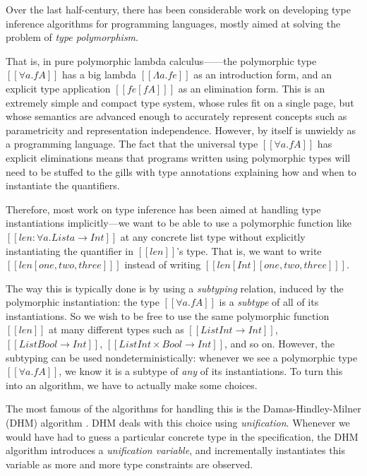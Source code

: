 Over the last half-century, there has been considerable work on developing type
inference algorithms for programming languages,  mostly aimed at solving the
problem of \emph{type polymorphism}.

That is, in pure polymorphic lambda
calculus---\systemf\cite{girard-system-f,jcr-system-f}---the polymorphic type
$[[∀a.fA]]$ has a big lambda $[[Λa.fe]]$ as an introduction form, and an
explicit type application $[[ fe[fA] ]]$ as an elimination form. This is an
extremely simple and compact type system, whose rules fit on a single page, but
whose semantics are advanced enough to accurately represent concepts such as
parametricity and representation independence. However, \systemf by itself is
unwieldy as a programming language. The fact that the universal type $[[∀a.fA]]$
has explicit eliminations means that programs written using polymorphic types
will need to be stuffed to the gills with type annotations explaining how and
when to instantiate the quantifiers.

Therefore, most work on type inference has been aimed at handling type
instantiations implicitly---we want to be able to use a polymorphic function
like $[[len : ∀a.List a → Int]]$ at any concrete list type without explicitly
instantiating the quantifier in $[[len]]$'s type. That is, we want to write
$[[ len [one,two,three] ]]$ instead of writing
$[[ len [Int] [one,two,three] ]]$.

The way this is typically done is by using a \emph{subtyping} relation, induced
by the polymorphic instantiation: the type $[[∀a.fA]]$ is a \emph{subtype} of
all of its instantiations. So we wish to be free to use the same polymorphic
function $[[len]]$ at many different types such as $[[List Int → Int]]$, $[[List
Bool → Int]]$, $[[List Int × Bool → Int]]$, and so on. However, the subtyping
can be used nondeterministically: whenever we see a polymorphic type
$[[∀a.fA]]$, we know it is a subtype of \emph{any} of its instantiations. To
turn this into an algorithm, we have to actually make some choices. 

The most famous of the algorithms for handling this is the Damas-Hindley-Milner
(DHM) algorithm \cite{hindley69:principal,milner78:theory,damas82:principal}.
DHM deals with this choice using \emph{unification}. Whenever we would have had
to guess a particular concrete type in the specification, the DHM algorithm
introduces a \emph{unification variable}, and incrementally instantiates this variable
as more and more type constraints are observed.

